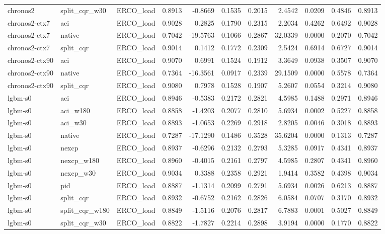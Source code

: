 \begin{tabular}{lllrrrrrrrr}
chronos2 & split_cqr_w30 & ERCO_load & 0.8913 & -0.8669 & 0.1535 & 0.2015 & 2.4542 & 0.0209 & 0.4846 & 0.8913 \\
chronos2-ctx7 & aci & ERCO_load & 0.9028 & 0.2825 & 0.1790 & 0.2315 & 2.2034 & 0.4262 & 0.6492 & 0.9028 \\
chronos2-ctx7 & native & ERCO_load & 0.7042 & -19.5763 & 0.1066 & 0.2867 & 32.0339 & 0.0000 & 0.2070 & 0.7042 \\
chronos2-ctx7 & split_cqr & ERCO_load & 0.9014 & 0.1412 & 0.1772 & 0.2309 & 2.5424 & 0.6914 & 0.6727 & 0.9014 \\
chronos2-ctx90 & aci & ERCO_load & 0.9070 & 0.6991 & 0.1524 & 0.1912 & 3.3649 & 0.0938 & 0.3507 & 0.9070 \\
chronos2-ctx90 & native & ERCO_load & 0.7364 & -16.3561 & 0.0917 & 0.2339 & 29.1509 & 0.0000 & 0.5578 & 0.7364 \\
chronos2-ctx90 & split_cqr & ERCO_load & 0.9080 & 0.7978 & 0.1528 & 0.1907 & 5.2607 & 0.0554 & 0.3214 & 0.9080 \\
lgbm-s0 & aci & ERCO_load & 0.8946 & -0.5383 & 0.2172 & 0.2821 & 4.5985 & 0.1488 & 0.2971 & 0.8946 \\
lgbm-s0 & aci_w180 & ERCO_load & 0.8858 & -1.4203 & 0.2077 & 0.2810 & 5.6934 & 0.0002 & 0.5227 & 0.8858 \\
lgbm-s0 & aci_w30 & ERCO_load & 0.8893 & -1.0653 & 0.2269 & 0.2918 & 2.8205 & 0.0046 & 0.3018 & 0.8893 \\
lgbm-s0 & native & ERCO_load & 0.7287 & -17.1290 & 0.1486 & 0.3528 & 35.6204 & 0.0000 & 0.1313 & 0.7287 \\
lgbm-s0 & nexcp & ERCO_load & 0.8937 & -0.6296 & 0.2132 & 0.2793 & 5.3285 & 0.0917 & 0.4341 & 0.8937 \\
lgbm-s0 & nexcp_w180 & ERCO_load & 0.8960 & -0.4015 & 0.2161 & 0.2797 & 4.5985 & 0.2807 & 0.4341 & 0.8960 \\
lgbm-s0 & nexcp_w30 & ERCO_load & 0.9034 & 0.3388 & 0.2358 & 0.2921 & 1.9414 & 0.3582 & 0.4398 & 0.9034 \\
lgbm-s0 & pid & ERCO_load & 0.8887 & -1.1314 & 0.2099 & 0.2791 & 5.6934 & 0.0026 & 0.6213 & 0.8887 \\
lgbm-s0 & split_cqr & ERCO_load & 0.8932 & -0.6752 & 0.2162 & 0.2826 & 6.0584 & 0.0707 & 0.3170 & 0.8932 \\
lgbm-s0 & split_cqr_w180 & ERCO_load & 0.8849 & -1.5116 & 0.2076 & 0.2817 & 6.7883 & 0.0001 & 0.5027 & 0.8849 \\
lgbm-s0 & split_cqr_w30 & ERCO_load & 0.8822 & -1.7827 & 0.2214 & 0.2898 & 3.9194 & 0.0000 & 0.1770 & 0.8822 \\

\end{tabular}
